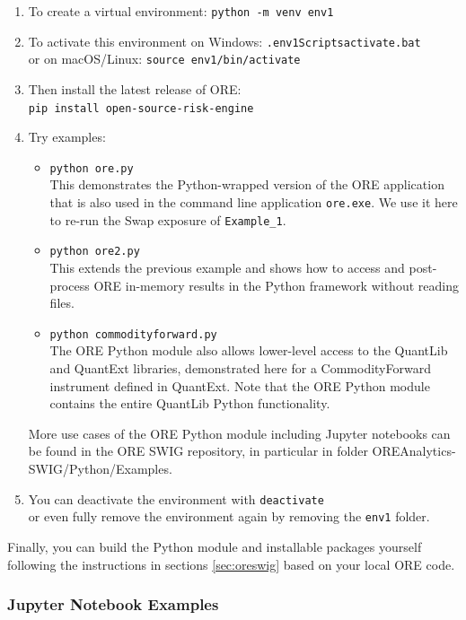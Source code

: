 \begin{enumerate}
\item To create a virtual environment: {\tt python -m venv env1}
\item To activate this environment on Windows: {\tt .{\bs}env1{\bs}Scripts{\bs}activate.bat}  \\
or on macOS/Linux: {\tt source env1/bin/activate }
\item Then install the latest release of ORE:\\
{\tt pip install open-source-risk-engine }
\item Try examples:\\
  \begin{itemize}
  \item {\tt python ore.py} \\
    This demonstrates the Python-wrapped version of the ORE application that is also used in the command line application
    {\tt ore.exe}. We use it here to re-run the Swap exposure of {\tt Example\_1}.
  \item {\tt python ore2.py} \\
    This extends the previous example and shows how to access and post-process ORE in-memory results in the Python
    framework without reading files.
  \item {\tt python commodityforward.py} \\
    The ORE Python module also allows lower-level access to the QuantLib and QuantExt libraries, demonstrated here for
    a CommodityForward instrument defined in QuantExt.
    Note that the ORE Python module contains the entire QuantLib Python functionality.
  \end{itemize}
  More use cases of the ORE Python module including Jupyter notebooks can be found in the ORE SWIG repository,
  in particular in folder OREAnalytics-SWIG/Python/Examples.
\item You can deactivate the environment with {\tt deactivate} \\
  or even fully remove the environment again by removing the {\tt env1} folder.
\end{enumerate}

Finally, you can build the Python module and installable packages yourself following the instructions in sections
\ref{sec:oreswig} based on your local ORE code.

\subsubsection*{Jupyter Notebook Examples}

